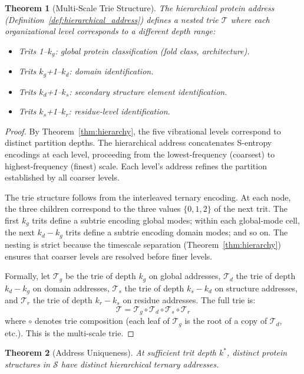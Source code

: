 \documentclass[11pt,twocolumn,a4paper]{article}
\newtheorem{theorem}{Theorem}[section]
\theoremstyle{definition}
\theoremstyle{remark}
\newcommand{\Sspace}{\mathcal{S}}
\newcommand{\Trie}{\mathcal{T}}
\begin{document}
\begin{theorem}[Multi-Scale Trie Structure]
\label{thm:multiscale}
The hierarchical protein address (Definition~\ref{def:hierarchical_address}) defines a nested trie $\Trie$ where each organizational level corresponds to a different depth range:
\begin{itemize}[nosep]
\item Trits 1--$k_g$: global protein classification (fold class, architecture).
\item Trits $k_g$+1--$k_d$: domain identification.
\item Trits $k_d$+1--$k_s$: secondary structure element identification.
\item Trits $k_s$+1--$k_r$: residue-level identification.
\end{itemize}
\end{theorem}

\begin{proof}
By Theorem~\ref{thm:hierarchy}, the five vibrational levels correspond to distinct partition depths. The hierarchical address concatenates S-entropy encodings at each level, proceeding from the lowest-frequency (coarsest) to highest-frequency (finest) scale. Each level's address refines the partition established by all coarser levels.

The trie structure follows from the interleaved ternary encoding. At each node, the three children correspond to the three values $\{0, 1, 2\}$ of the next trit. The first $k_g$ trits define a subtrie encoding global modes; within each global-mode cell, the next $k_d - k_g$ trits define a subtrie encoding domain modes; and so on. The nesting is strict because the timescale separation (Theorem~\ref{thm:hierarchy}) ensures that coarser levels are resolved before finer levels.

Formally, let $\Trie_g$ be the trie of depth $k_g$ on global addresses, $\Trie_d$ the trie of depth $k_d - k_g$ on domain addresses, $\Trie_s$ the trie of depth $k_s - k_d$ on structure addresses, and $\Trie_r$ the trie of depth $k_r - k_s$ on residue addresses. The full trie is:
\begin{equation}
\Trie = \Trie_g \circ \Trie_d \circ \Trie_s \circ \Trie_r
\end{equation}
where $\circ$ denotes trie composition (each leaf of $\Trie_g$ is the root of a copy of $\Trie_d$, etc.). This is the multi-scale trie.
\end{proof}

\begin{theorem}[Address Uniqueness]
\label{thm:uniqueness}
At sufficient trit depth $k^*$, distinct protein structures in $\Sspace$ have distinct hierarchical ternary addresses.
\end{theorem}
\end{document}
